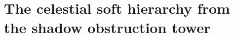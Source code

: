 %

\section{The celestial soft hierarchy from the shadow obstruction tower}
\label{ch:thqg-soft-graviton}%

\providecommand{\Sh}{\operatorname{Sh}}
\providecommand{\cA}{\mathcal{A}}
\providecommand{\cV}{\mathcal{V}}
\providecommand{\MC}{\text{MC}}
\providecommand{\gAmod}{\mathfrak{g}_{\cA}^{\mathrm{mod}}}
\providecommand{\Defcyc}{\operatorname{Def}_{\mathrm{cyc}}}
\providecommand{\dzero}{d_0}
\providecommand{\barBch}{\bar{B}^{\text{ch}}}
\providecommand{\Omegach}{\Omega^{\text{ch}}}
\providecommand{\dfib}{d_{\mathrm{fib}}}
\providecommand{\Ydg}{\mathcal{Y}^{\mathrm{dg}}}
\providecommand{\Gmod}{\mathcal{G}^{\mathrm{mod}}}
\providecommand{\Convstr}{\operatorname{Conv}_{\mathrm{str}}}
\providecommand{\Convinf}{\operatorname{Conv}_{\infty}}
\providecommand{\Definfmod}{\operatorname{Def}_{\infty}^{\mathrm{mod}}}
\providecommand{\Res}{\operatorname{Res}}
\providecommand{\Tr}{\operatorname{Tr}}
\providecommand{\ad}{\operatorname{ad}}
\providecommand{\id}{\mathrm{id}}
\providecommand{\rank}{\operatorname{rank}}
\providecommand{\wt}{\operatorname{wt}}
\providecommand{\Hom}{\operatorname{Hom}}
\providecommand{\End}{\operatorname{End}}
\providecommand{\Sym}{\operatorname{Sym}}
\providecommand{\Aut}{\operatorname{Aut}}
\providecommand{\sgn}{\operatorname{sgn}}
\providecommand{\Dg}[1]{D_{#1}}
\providecommand{\mcurv}[1]{m_0^{(#1)}}
\providecommand{\colldiv}[2]{D_{#1#2}}
\providecommand{\LogForm}[2]{\eta_{#1#2}}
\providecommand{\fg}{\mathfrak{g}}
\providecommand{\cW}{\mathcal{W}}

